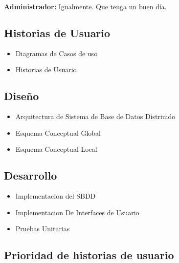 \documentclass[spanish,12pt]{article}
\providecommand{\tightlist}{\setlength{\itemsep}{0pt}\setlength{\parskip}{0pt}}
\begin{document}
\textbf{Administrador:} Igualmente. Que tenga un buen día.

\subsection{Historias de Usuario}\label{historias-de-usuario-1}

\begin{itemize}
\tightlist
\item
  Diagramas de Casos de uso
\item
  Historias de Usuario
\end{itemize}

\subsection{Diseño}\label{diseuxf1o}

\begin{itemize}
\tightlist
\item
  Arquitectura de Sistema de Base de Datos Distriuido
\item
  Esquema Conceptual Global
\item
  Esquema Conceptual Local
\end{itemize}

\subsection{Desarrollo}\label{desarrollo}

\begin{itemize}
\tightlist
\item
  Implementacion del SBDD
\item
  Implementacion De Interfaces de Usuario
\item
  Pruebas Unitarias
\end{itemize}

\subsection{Prioridad de historias de
usuario}\label{prioridad-de-historias-de-usuario}
\end{document}
